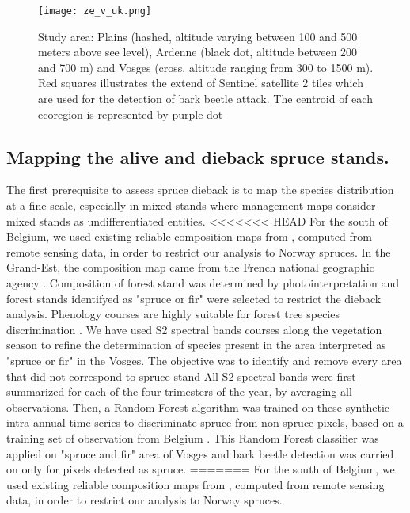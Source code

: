 \documentclass[3p,procedia]{elsarticle}
\begin{document}
\begin{figure} [htbp] 
	\centering
	\texttt{[image: ze\_v\_uk.png]}
	\caption{Study area: Plains (hashed, altitude varying between 100 and 500 meters above see level), Ardenne (black dot, altitude between 200 and 700 m) and Vosges (cross, altitude ranging from 300 to 1500 m). Red squares illustrates the extend of Sentinel satellite 2 tiles which are used for the detection of bark beetle attack. The centroid of each ecoregion is represented by purple dot}
	\label{fig:situ}
\end{figure}

\subsection{Mapping the alive and dieback spruce stands.}
The first prerequisite to assess spruce dieback is to map the species distribution at a fine scale, especially in mixed stands where management maps consider mixed stands as undifferentiated entities.
<<<<<<< HEAD
For the south of Belgium, we used existing reliable composition maps from \cite{bolyn_mapping_2022}, computed from remote sensing data, in order to restrict our analysis to Norway spruces.
In the Grand-Est, the composition map came from the French national geographic agency \citep{IGN_bd_2018}. 
Composition of forest stand was determined by photointerpretation and forest stands identifyed as "spruce or fir"  were selected to restrict the dieback analysis.
Phenology courses are highly suitable for forest tree species discrimination \citep{lisein_discrimination_2015,grabska_forest_2019,ma_tree_2021}.
We have used S2 spectral bands courses along the vegetation season to refine the determination of species present in the area interpreted as "spruce or fir" in the Vosges.
The objective was to identify and remove every area that did not correspond to spruce stand
All S2 spectral bands were first summarized for each of the four trimesters of the year, by averaging all observations.
Then, a Random Forest algorithm was trained on these synthetic intra-annual time series to discriminate spruce from non-spruce pixels, based on a training set of observation from Belgium \citep{bolyn_forest_2018}.
This Random Forest classifier was applied on "spruce and fir" area of Vosges and bark beetle detection was carried on only for pixels detected as spruce. 
=======
For the south of Belgium, we used existing reliable composition maps from \cite{bolyn_mapping_2022}, computed from remote sensing data, in order to restrict our analysis to Norway spruces. 
\end{document}
